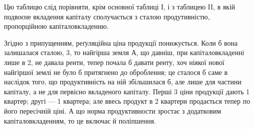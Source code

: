 \noindent{}Цю
таблицю слід порівняти, крім основної таблиці І, і з таблицею II, в якій
подвоєне вкладення капіталу сполучається з сталою продутивністю, пропорційною
капіталовкладенню.

Згідно з припущенням, реґуляційна ціна продукції понижується. Коли б
вона залишалася сталою, 3, то найгірша земля $А$, що давніш, при
капіталовкладенні лише в 2, не давала ренти, тепер почала б давати
ренту, хоч ніякої нової найгіршої землі не було б притягнено до оброблення;
це сталося б саме в наслідок того, що продуктивність на ній збільшилася б, але
лише для частини капіталу, а не для первісно вкладеного капіталу. Перші 3 ціни продукції дають 1 квартер; другі — 1 квартера; але ввесь продукт в
2 квартери продається тепер по його пересічній ціні. А що норма продуктивности
зростає з додатковим капіталовкладенням, то це включає й поліпшення.

